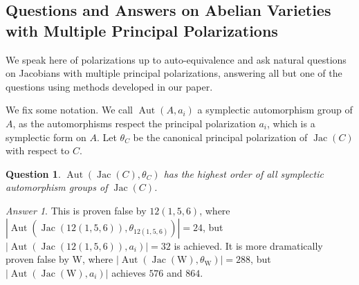 \documentclass[12pt,reqno]{amsart}
\DeclareMathOperator{\Aut}{Aut}
\DeclareMathOperator{\Jac}{Jac}
\newcommand{\C}{\mathbb{C}}
\renewcommand{\P}{\mathbb{P}}
\newtheorem*{question}{Question}
\theoremstyle{definition}
\theoremstyle{remark}
\newtheorem*{answer}{Answer}
\begin{document}


\subsection{Questions and Answers on Abelian Varieties with Multiple Principal Polarizations}
\label{sec:questions}


We speak here of polarizations up to auto-equivalence and ask natural questions on Jacobians with multiple principal polarizations, answering all but one of the questions using methods developed in our paper.

We fix some notation. We call $\Aut(A, a_i)$ a symplectic automorphism group of $A$, as the automorphisms respect the principal polarization $a_i$, which is a symplectic form on $A$. Let $\theta_C$ be the canonical principal polarization of $\Jac(C)$ with respect to $C$.

\begin{question} $\Aut(\Jac(C), \theta_C)$ has the highest order of all symplectic automorphism groups of $\Jac(C)$. \end{question}

\begin{answer} This is proven false by $12(1,5,6)$, where $|\Aut(\Jac(12(1, 5, 6)), \theta_{12(1, 5, 6)})| = 24$, but $|\Aut(\Jac(12(1, 5, 6)), a_i)| = 32$ is achieved. It is more dramatically proven false by W, where $|\Aut(\Jac(\text{W}), \theta_{\text{W}})| = 288$, but $|\Aut(\Jac(\text{W}), a_i)|$ achieves $576$ and $864$. \end{answer}
\end{document}
